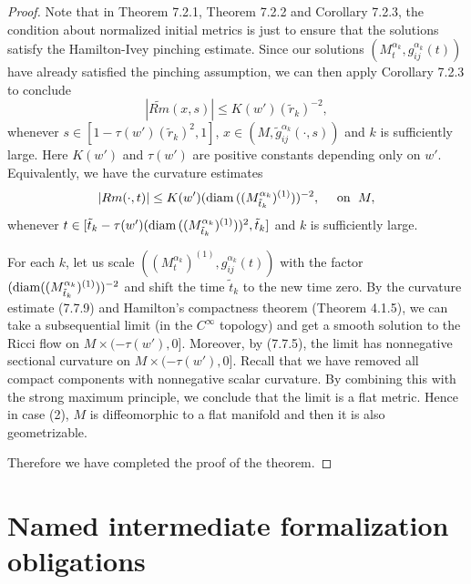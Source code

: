 \begin{proof}
Note that in Theorem 7.2.1, Theorem 7.2.2 and Corollary 7.2.3, the
condition about normalized initial metrics is just to ensure that
the solutions satisfy the Hamilton-Ivey pinching estimate. Since
our solutions $(M^{\alpha_k}_t,g^{\alpha_k}_{ij}(t))$ have already
satisfied the pinching assumption, we can then apply Corollary
7.2.3 to conclude
$$
|\widetilde{Rm}(x,s)| \leq K(w')(\tilde{r}_k)^{-2},
$$
whenever $s \in [1- \tau(w')(\tilde{r}_k)^{2}, 1]$, $x \in
(M,\tilde{g}^{\alpha_k}_{ij}(\cdot,s))$ and $k$ is sufficiently
large. Here $K(w')$ and $\tau(w')$ are positive constants
depending only on $w'$. Equivalently, we have the curvature
estimates \begin{equation} |Rm(\cdot,t)| \leq K(w') ({\rm
diam}\,((M^{\alpha_k}_{\tilde{t}_k})^{(1)}))^{-2},
\quad \mbox{ on }\;  M, %
\end{equation} whenever $t \in [\tilde{t}_k - \tau(w')({\rm
diam}\,((M^{\alpha_k}_{\tilde{t}_k})^{(1)}))^{2},\tilde{t}_k]$ and
$k$ is sufficiently large.

\smallskip\noindent
For each $k$, let us scale
$((M^{\alpha_k}_t)^{(1)},g^{\alpha_k}_{ij}(t))$ with the factor
$({\rm diam}((M^{\alpha_k}_{\tilde{t}_k})^{(1)}))^{-2}$ and shift
the time $\tilde{t}_k$ to the new time zero. By the curvature
estimate (7.7.9) and Hamilton's compactness theorem (Theorem
4.1.5), we can take a subsequential limit (in the $C^{\infty}$
topology) and get a smooth solution to the Ricci flow on $M \times
(-\tau(w'),0]$.  Moreover, by (7.7.5), the limit has nonnegative
sectional curvature on $M \times (-\tau(w'),0]$. Recall that we
have removed all compact components with nonnegative scalar
curvature. By combining this with the strong maximum principle, we
conclude that the limit is a flat metric. Hence in case (2), $M$
is diffeomorphic to a flat manifold and then it is also
geometrizable.

Therefore we have completed the proof of the theorem.
\end{proof}


\newpage

\section{Named intermediate formalization obligations}

